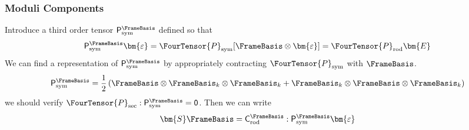 \subsubsection{Moduli Components}\label{moduli-components}

Introduce a third order tensor
\(\ThreeTensor{P}_{\mathrm{sym}}^{\FrameBasis}\) defined so that 
\[
\ThreeTensor{P}_{\mathrm{sym}}^{\FrameBasis} \bm{\varepsilon} = \FourTensor{P}_{\mathrm{sym}}[\FrameBasis \otimes\bm{\varepsilon}] = \FourTensor{P}_{\mathrm{rod}}\bm{E}
\] 
We can find a representation of
\(\ThreeTensor{P}_{\mathrm{sym}}^{\FrameBasis}\) by appropriately
contracting \(\FourTensor{P}_{\mathrm{sym}}\) with \(\FrameBasis\). 
\[
\ThreeTensor{P}_{\mathrm{sym}}^{\FrameBasis} = \frac{1}{2} \left(\FrameBasis\otimes \FrameBasis_k\otimes\FrameBasis_k + \FrameBasis_k \otimes \FrameBasis\otimes\FrameBasis_k\right)
\] 
we should verify
\(\FourTensor{P}_{\mathrm{sec}}:\ThreeTensor{P}_{\mathrm{sym}}^{\FrameBasis} = \ThreeTensor{0}\).
Then we can write 
\[
\bm{S}\FrameBasis = \ThreeTensor{C}_{\mathrm{rod}}^{\FrameBasis}:\ThreeTensor{P}_{\mathrm{sym}}^{\FrameBasis} \bm{\varepsilon}
\]
